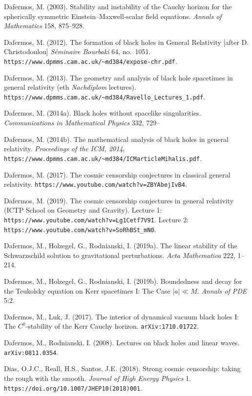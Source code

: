 \documentclass[12pt]{article}
\begin{document}
\begin{small}
\begin{thebibliography}{99}
 \item[] Dafermos, M. (2003). Stability and instability of the Cauchy horizon for the spherically symmetric Einstein--Maxwell-scalar field equations. \emph{Annals of Mathematics} 158, 875--928. 
 \item[] Dafermos, M. (2012). The formation of black holes in General Relativity [after D. Christodoulou]
\emph{S\'{e}minaire Bourbaki} 64, no.\ 1051. \verb#https://www.dpmms.cam.ac.uk/~md384/expose-chr.pdf#.
 \item[] Dafermos, M. (2013). The geometry and analysis of black hole spacetimes in general relativity ({\sc eth} \emph{Nachdiplom} lectures). \verb#https://www.dpmms.cam.ac.uk/~md384/Ravello_Lectures_1.pdf#.
  \item[] Dafermos, M. (2014a). Black holes without spacelike singularities. 
   \emph{Communications in Mathematical Physics} 332, 729--
 \item[] Dafermos, M. (2014b). The mathematical analysis of black holes in general relativity. 
\emph{Proceedings of the ICM, 2014}, \verb#https://www.dpmms.cam.ac.uk/~md384/ICMarticleMihalis.pdf#.
 \item[] Dafermos, M. (2017). The cosmic censorship conjectures in classical general relativity. \verb#https://www.youtube.com/watch?v=ZBYAbejIvB4#.
  \item[] Dafermos, M. (2019).
 The cosmic censorship conjectures in general relativity  (ICTP School on Geometry and Gravity). 
  Lecture 1:  \verb#https://www.youtube.com/watch?v=Lg1Cetf7V9I#. 
Lecture 2:  \verb#https://www.youtube.com/watch?v=SoRhBSt_mN0#.
  \item[] Dafermos, M., Holzegel, G., Rodnianski, I. (2019a).
  The linear stability of the Schwarzschild solution to gravitational perturbations. \emph{Acta Mathematica} 222, 1--214. 
    \item[] Dafermos, M., Holzegel, G., Rodnianski, I. (2019b).
Boundedness and decay for the Teukolsky equation on Kerr spacetimes I: The Case $|a|\ll M$. 
\emph{Annals of PDE} 5:2. 
  \item[] Dafermos, M., Luk, J. (2017). The interior of dynamical vacuum black holes I: The $C^0$-stability of the Kerr Cauchy horizon. \texttt{arXiv:1710.01722}.
  \item[] Dafermos, M., Rodnianski, I. (2008). Lectures on black holes and linear waves. \texttt{arXiv:0811.0354}.
  \item[] 
Dias, O.J.C.,  Reall, H.S., Santos, J.E. (2018).
 Strong cosmic censorship: taking the rough with the smooth. \emph{Journal of High Energy Physics} 1. \verb#https://doi.org/10.1007/JHEP10(2018)001#.

\end{thebibliography}
\end{small}
\end{document}
